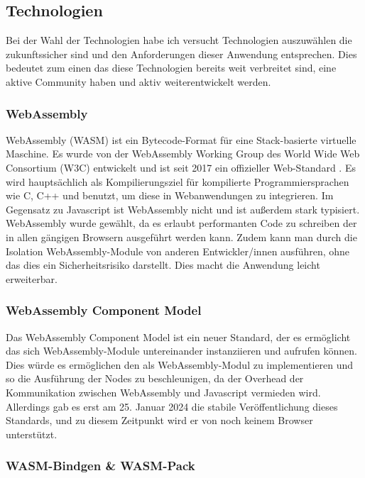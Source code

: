 \documentclass[ngerman]{article}
\begin{document}
\pagebreak

\subsection{Technologien}

Bei der Wahl der Technologien habe ich versucht Technologien auszuwählen die zukunftssicher sind und den Anforderungen dieser Anwendung entsprechen. Dies bedeutet zum einen das diese Technologien bereits weit verbreitet sind, eine aktive Community haben und aktiv weiterentwickelt werden.

\subsubsection{WebAssembly}
WebAssembly (WASM) ist ein Bytecode-Format für eine Stack-basierte virtuelle Maschine. Es wurde von der WebAssembly Working Group des World Wide Web Consortium (W3C) entwickelt und ist seit 2017 ein offizieller Web-Standard \cite{Haas2017}. 
\br
Es wird hauptsächlich als Kompilierungsziel für kompilierte Programmiersprachen wie C, C++ und  benutzt, um diese in Webanwendungen zu integrieren. Im Gegensatz zu Javascript ist WebAssembly nicht  und ist außerdem stark typisiert.
\br
WebAssembly wurde gewählt, da es erlaubt performanten Code zu schreiben der in allen gängigen Browsern ausgeführt werden kann. 
Zudem kann man durch die Isolation WebAssembly-Module von anderen Entwickler/innen ausführen, ohne das dies ein Sicherheitsrisiko darstellt. Dies macht die Anwendung leicht erweiterbar.
\subsubsection*{WebAssembly Component Model}
Das WebAssembly Component Model ist ein neuer Standard, der es ermöglicht das sich WebAssembly-Module untereinander instanziieren und aufrufen können. \cite{bytecodeallianceIntroductionWebAssembly} 
Dies würde es ermöglichen den  als WebAssembly-Modul zu implementieren und so die Ausführung der Nodes zu beschleunigen, da der Overhead der Kommunikation zwischen WebAssembly und Javascript vermieden wird. Allerdings gab es erst am 25. Januar 2024 die stabile Veröffentlichung dieses Standards, und zu diesem Zeitpunkt wird er von noch keinem Browser unterstützt.

\subsubsection{WASM-Bindgen \& WASM-Pack}
\label{sec:WASM-Bindgen}
\end{document}
